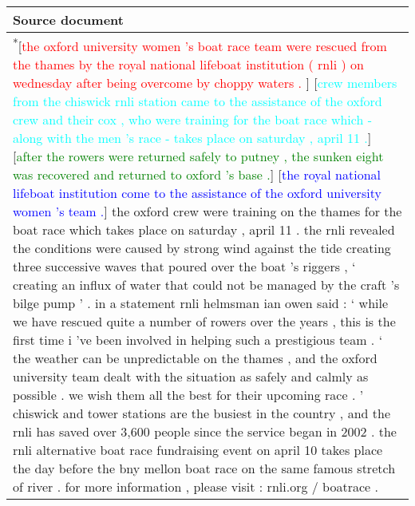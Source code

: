 \documentclass[11pt,a4paper]{article}
\begin{document}
\begin{figure*}[t]
\centering
\begin{tabular*}{\textwidth}{| p{} | }
  \hline
  \textbf{Source document} \\ \hline
        \textsuperscript{*}[\textcolor{red}{the oxford university women 's boat race team were rescued from the thames by the royal national lifeboat institution ( rnli ) on wednesday after being overcome by choppy waters . }]
        \textsuperscript{}[\textcolor{cyan}{crew members from the chiswick rnli station came to the assistance of the oxford crew and their cox , who were training for the boat race which - along with the men 's race - takes place on saturday , april 11 .}]
        \textsuperscript{}[\textcolor{green}{after the rowers were returned safely to putney , the sunken eight was recovered and returned to oxford 's base .}]
        \textsuperscript{}[\textcolor{blue}{the royal national lifeboat institution come to the assistance of the oxford university women 's team .}]
        the oxford crew were training on the thames for the boat race which takes place on saturday , april 11 .
        the rnli revealed the conditions were caused by strong wind against the tide creating three successive waves that poured over the boat 's riggers , ` creating an influx of water that could not be managed by the craft 's bilge pump ' .
        in a statement rnli helmsman ian owen said : ` while we have rescued quite a number of rowers over the years , this is the first time i 've been involved in helping such a prestigious team .
        ` the weather can be unpredictable on the thames , and the oxford university team dealt with the situation as safely and calmly as possible . we wish them all the best for their upcoming race . '
        chiswick and tower stations are the busiest in the country , and the rnli has saved over 3,600 people since the service began in 2002 .
        the rnli alternative boat race fundraising event on april 10 takes place the day before the bny mellon boat race on the same famous stretch of river . for more information , please visit : rnli.org / boatrace .



\end{tabular*}
\end{figure*}
\end{document}
